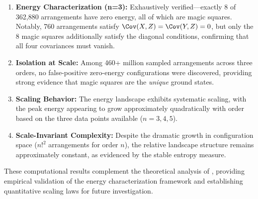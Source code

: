 \begin{enumerate}
\item \textbf{Energy Characterization (n=3):} Exhaustively verified---exactly 8 of 362,880 
arrangements have zero energy, all of which are magic squares.
Notably, 760 arrangements satisfy $\Cov(X,Z) = \Cov(Y,Z) = 0$, but only the 8 magic squares
additionally satisfy the diagonal conditions, confirming that all four covariances must vanish.

\item \textbf{Isolation at Scale:} Among 460+ million sampled arrangements across three orders,
no false-positive zero-energy configurations were discovered,
providing strong evidence that magic squares are the \emph{unique} ground states.

\item \textbf{Scaling Behavior:} The energy landscape exhibits systematic scaling,
with the peak energy appearing to grow approximately quadratically with order 
based on the three data points available ($n=3,4,5$).

\item \textbf{Scale-Invariant Complexity:} Despite the dramatic growth in configuration space
($n!^2$ arrangements for order $n$), the relative landscape structure remains approximately constant,
as evidenced by the stable entropy measure.
\end{enumerate}

These computational results complement the theoretical analysis of ,
providing empirical validation of the energy characterization framework
and establishing quantitative scaling laws for future investigation.
